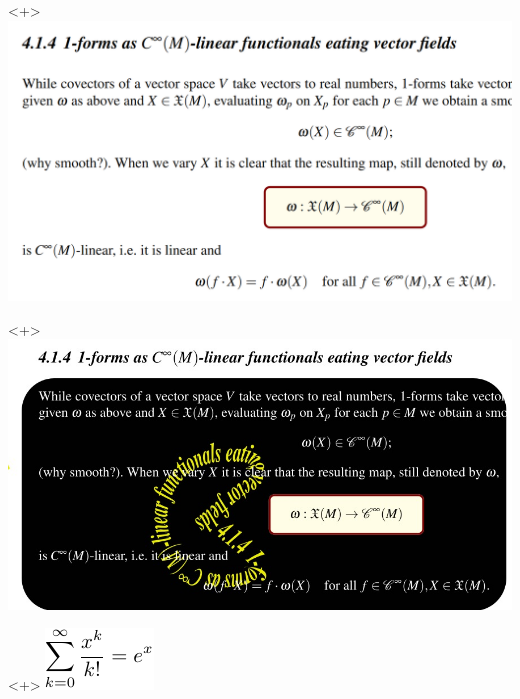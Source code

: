 \begin{frame}
    \begin{onlyenv}<+>
        \includegraphics[width=\textwidth,height=0.8\textheight,keepaspectratio]{assets/pacman-before.png}
    \end{onlyenv}
    \begin{onlyenv}<+>
        \includegraphics[width=\textwidth,height=0.8\textheight,keepaspectratio]{assets/pacman.jpg}
    \end{onlyenv}
    \begin{onlyenv}<+>
        \includegraphics[width=\textwidth,height=0.8\textheight,keepaspectratio]{assets/document-standalone.pdf}

\end{onlyenv}
\end{frame}

